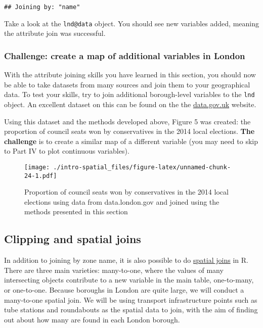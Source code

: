 \documentclass[]{article}
\begin{document}
\begin{verbatim}
## Joining by: "name"
\end{verbatim}

Take a look at the \texttt{lnd@data} object. You should see new
variables added, meaning the attribute join was successful.

\subsubsection{Challenge: create a map of additional variables in
London}\label{challenge-create-a-map-of-additional-variables-in-london}

With the attribute joining skills you have learned in this section, you
should now be able to take datasets from many sources and join them to
your geographical data. To test your skills, try to join additional
borough-level variables to the \texttt{lnd} object. An excellent dataset
on this can be found on the the
\href{http://data.london.gov.uk/dataset/london-borough-profiles}{data.gov.uk}
website.

Using this dataset and the methods developed above, Figure 5 was
created: the proportion of council seats won by conservatives in the
2014 local elections. \textbf{The challenge} is to create a similar map
of a different variable (you may need to skip to Part IV to plot
continuous variables).

\begin{figure}[htbp]
\centering
\texttt{[image: ./intro-spatial\_files/figure-latex/unnamed-chunk-24-1.pdf]}
\caption{Proportion of council seats won by conservatives in the 2014
local elections using data from data.london.gov and joined using the
methods presented in this section}
\end{figure}

\subsection{Clipping and spatial
joins}\label{clipping-and-spatial-joins}

In addition to joining by zone name, it is also possible to do
\href{http://help.arcgis.com/en/arcgisdesktop/10.0/help/index.html\#//00080000000q000000}{spatial
joins} in R. There are three main varieties: many-to-one, where the
values of many intersecting objects contribute to a new variable in the
main table, one-to-many, or one-to-one. Because boroughs in London are
quite large, we will conduct a many-to-one spatial join. We will be
using transport infrastructure points such as tube stations and
roundabouts as the spatial data to join, with the aim of finding out
about how many are found in each London borough.
\end{document}
